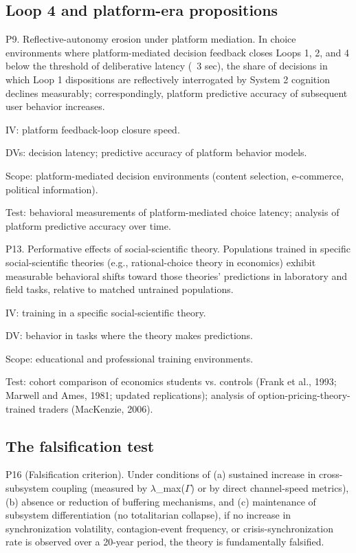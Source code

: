 \documentclass[12pt,a4paper]{article}
\begin{document}
\subsection{Loop 4 and platform-era propositions}

P9. Reflective-autonomy erosion under platform mediation. In choice environments where platform-mediated decision feedback closes Loops 1, 2, and 4 below the threshold of deliberative latency (~3 sec), the share of decisions in which Loop 1 dispositions are reflectively interrogated by System 2 cognition declines measurably; correspondingly, platform predictive accuracy of subsequent user behavior increases.


IV: platform feedback-loop closure speed.

DVs: decision latency; predictive accuracy of platform behavior models.

Scope: platform-mediated decision environments (content selection, e-commerce, political information).

Test: behavioral measurements of platform-mediated choice latency; analysis of platform predictive accuracy over time.


P13. Performative effects of social-scientific theory. Populations trained in specific social-scientific theories (e.g., rational-choice theory in economics) exhibit measurable behavioral shifts toward those theories' predictions in laboratory and field tasks, relative to matched untrained populations.


IV: training in a specific social-scientific theory.

DV: behavior in tasks where the theory makes predictions.

Scope: educational and professional training environments.

Test: cohort comparison of economics students vs. controls (Frank et al., 1993; Marwell and Ames, 1981; updated replications); analysis of option-pricing-theory-trained traders (MacKenzie, 2006).

\subsection{The falsification test}

P16 (Falsification criterion). Under conditions of (a) sustained increase in cross-subsystem coupling (measured by $\lambda$_max($\Gamma$) or by direct channel-speed metrics), (b) absence or reduction of buffering mechanisms, and (c) maintenance of subsystem differentiation (no totalitarian collapse), if no increase in synchronization volatility, contagion-event frequency, or crisis-synchronization rate is observed over a 20-year period, the theory is fundamentally falsified.
\end{document}
